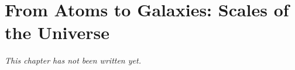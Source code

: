 \chapter{From Atoms to Galaxies: Scales of the Universe}\label{ch:g9:atoms-to-galaxies}


\emph{This chapter has not been written yet.}
